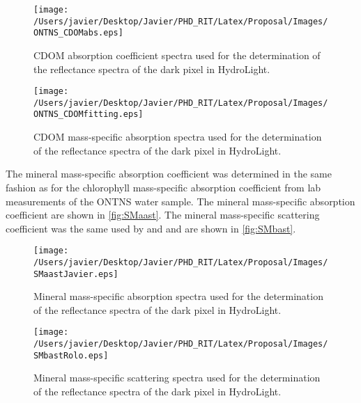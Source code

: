 \begin{figure}[htb]
  	\centering
  	\texttt{[image: /Users/javier/Desktop/Javier/PHD\_RIT/Latex/Proposal/Images/ONTNS\_CDOMabs.eps]}
  \caption{CDOM absorption coefficient spectra used for the determination of the reflectance spectra of the dark pixel in HydroLight. \label{fig:CDOMa} } 
\end{figure}

\begin{figure}[htb]
  	\centering
  	\texttt{[image: /Users/javier/Desktop/Javier/PHD\_RIT/Latex/Proposal/Images/ONTNS\_CDOMfitting.eps]}
  \caption{CDOM mass-specific absorption spectra used for the determination of the reflectance spectra of the dark pixel in HydroLight. \label{fig:CDOMaast} }
\end{figure}

The mineral mass-specific absorption coefficient was determined in the same fashion as for the chlorophyll mass-specific absorption coefficient from lab measurements of the ONTNS water sample. The mineral mass-specific absorption coefficient are shown in \autoref{fig:SMaast}. The mineral mass-specific scattering coefficient was the same used by \cite{Raqueno:2000} and \cite{Raqueno:2003} and are shown in \autoref{fig:SMbast}.

\begin{figure}[!ht]
  	\centering
  	\texttt{[image: /Users/javier/Desktop/Javier/PHD\_RIT/Latex/Proposal/Images/SMaastJavier.eps]}
  \caption{Mineral mass-specific absorption spectra used for the determination of the reflectance spectra of the dark pixel in HydroLight. \label{fig:SMaast} } 
\end{figure}

\begin{figure}[!ht]
  	\centering
  	\texttt{[image: /Users/javier/Desktop/Javier/PHD\_RIT/Latex/Proposal/Images/SMbastRolo.eps]}
  \caption{Mineral mass-specific scattering spectra used for the determination of the reflectance spectra of the dark pixel in HydroLight. \label{fig:SMbast} } 
\end{figure}

